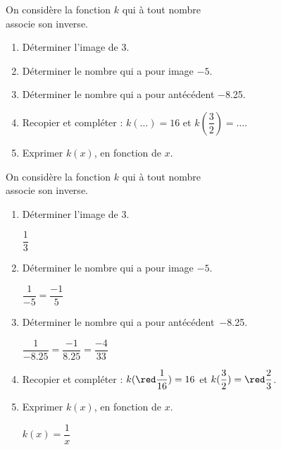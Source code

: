 \begin{exercice}
    On considère la fonction $k$ qui à tout nombre \\associe son inverse.
    \begin{enumerate}
        \item Déterminer l'image de $3$.
        \item Déterminer le nombre qui a pour image $-5$.
        \item Déterminer le nombre qui a pour antécédent \num{-8.25}.
        \item Recopier et compléter : $k(\dots{})=16$ et $k(\dfrac{3}{2})=\dots{}$.
        \item Exprimer $k(x)$, en fonction de $x$.
    \end{enumerate}
\end{exercice}
\begin{corrige}
    On considère la fonction $k$ qui à tout nombre \\associe son inverse.

    \begin{enumerate}
        \item Déterminer l'image de $3$.
        
        \smallskip
        {\red $\dfrac{1}{3}$}
        \smallskip
        \item Déterminer le nombre qui a pour image $-5$.
        
        \smallskip
        {\red $\dfrac{1}{-5}=\dfrac{-1}{5}$}
        \smallskip
    \end{enumerate}
    \Coupe
    \begin{enumerate}
    \setcounter{enumi}{2}
        \item Déterminer le nombre qui a pour \hbox{antécédent \num{-8.25}.}
        
        {\red $\dfrac{1}{\num{-8.25}}=\dfrac{-1}{\num{8.25}}=\dfrac{-4}{33}$}
        \item Recopier et compléter : $k({\red \dfrac{1}{16}})=16$ et $k(\dfrac{3}{2})={\red \dfrac{2}{3}}$.
        \item Exprimer $k(x)$, en fonction de $x$.
        
        {\red $k(x)=\dfrac{1}{x}$}
    \end{enumerate}
\end{corrige}
